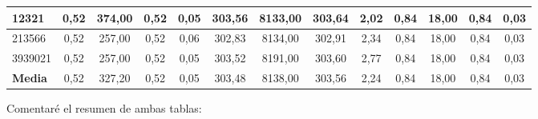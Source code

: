 \documentclass[12pt, spanish]{article}
\begin{document}
\begin{table}[H]
\begin{adjustwidth}{-1cm}{-1cm}
\begin{tabular}{|l|c|c|c|c|c|c|c|c|c|c|c|c|}
12321                                                   & 0,52                         & 374,00                         & 0,52                      & 0,05                   & 303,56                       & 8133,00                        & 303,64                    & 2,02                   & 0,84                         & 18,00                          & 0,84                      & 0,03                   \\ \hline
213566                                                  & 0,52                         & 257,00                         & 0,52                      & 0,06                   & 302,83                       & 8134,00                        & 302,91                    & 2,34                   & 0,84                         & 18,00                          & 0,84                      & 0,03                   \\ \hline
3939021                                                 & 0,52                         & 257,00                         & 0,52                      & 0,05                   & 303,52                       & 8191,00                        & 303,60                    & 2,77                   & 0,84                         & 18,00                          & 0,84                      & 0,03                   \\ \hline
\textbf{Media}                                          & 0,52                         & 327,20                         & 0,52                      & 0,05                   & 303,48                       & 8138,00                        & 303,56                    & 2,24                   & 0,84                         & 18,00                          & 0,84                      & 0,03                   \\ \hline
\end{tabular}
\end{adjustwidth}

\end{table}

\newpage

Comentaré el resumen de ambas tablas:
\end{document}
